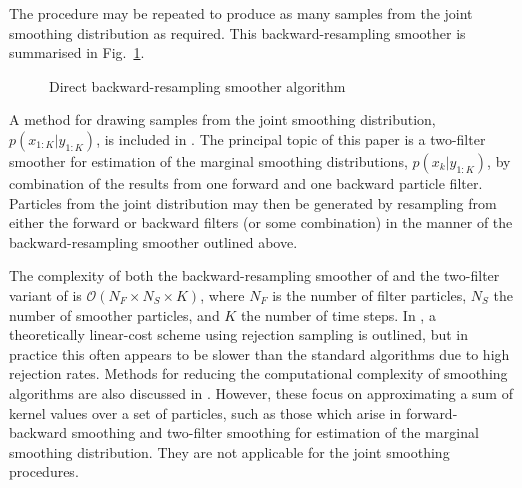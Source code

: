 \documentclass[10pt,twocolumn,twoside]{IEEEtran}
\begin{document}
The procedure may be repeated to produce as many samples from the joint smoothing distribution as required. This backward-resampling smoother is summarised in Fig.~\ref{alg:DBRS}.

\begin{figure}
\caption{Direct backward-resampling smoother algorithm}
\label{alg:DBRS}
\end{figure}

A method for drawing samples from the joint smoothing distribution, $p(x_{1:K}|y_{1:K})$, is included in \cite{Briers2010}. The principal topic of this paper is a two-filter smoother for estimation of the marginal smoothing distributions, $p(x_{k}|y_{1:K})$, by combination of the results from one forward and one backward particle filter. Particles from the joint distribution may then be generated by resampling from either the forward or backward filters (or some combination) in the manner of the backward-resampling smoother outlined above.

The complexity of both the backward-resampling smoother of \cite{Godsill2004} and the two-filter variant of \cite{Briers2010} is $\mathcal{O}(N_F \times N_S \times K)$, where $N_F$ is the number of filter particles, $N_S$ the number of smoother particles, and $K$ the number of time steps. In \cite{Douc2009}, a theoretically linear-cost scheme using rejection sampling is outlined, but in practice this often appears to be slower than the standard algorithms due to high rejection rates. Methods for reducing the computational complexity of smoothing algorithms are also discussed in \cite{Klaas2006}. However, these focus on approximating a sum of kernel values over a set of particles, such as those which arise in forward-backward smoothing \cite{Doucet2000a} and two-filter smoothing \cite{Briers2010} for estimation of the marginal smoothing distribution. They are not applicable for the joint smoothing procedures.
\end{document}
